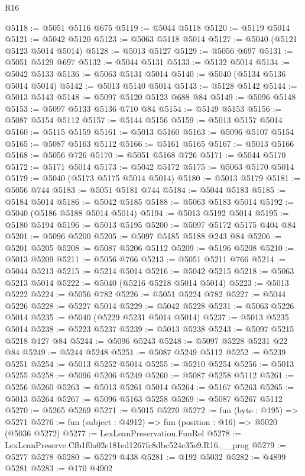 \begin{lexlean}{R16}
\begin{coremodule}
@5118 := @5051 @5116 @675
@5119 := @5044 @5118
@5120 := @5119 @5014
@5121 := @5042 @5120
@5123 := @5063 @5118 @5014
@5127 := @5040 (@5121 @5123 @5014 @5014)
@5128 := @5013 @5127
@5129 := @5056 @697
@5131 := @5051 @5129 @697
@5132 := @5044 @5131
@5133 := @5132 @5014
@5134 := @5042 @5133
@5136 := @5063 @5131 @5014
@5140 := @5040 (@5134 @5136 @5014 @5014)
@5142 := @5013 @5140 @5014
@5143 := @5128 @5142
@5144 := @5013 @5143
@5148 := @5097 @5120 @5123 @688 @84
@5149 := @5096 @5148
@5153 := @5097 @5133 @5136 @710 @84
@5154 := @5149 @5153
@5156 := @5087 @5154 @5112
@5157 := @5144 @5156
@5159 := @5013 @5157 @5014
@5160 := @5115 @5159
@5161 := @5013 @5160
@5163 := @5096 @5107 @5154
@5165 := @5087 @5163 @5112
@5166 := @5161 @5165
@5167 := @5013 @5166
@5168 := @5056 @726
@5170 := @5051 @5168 @726
@5171 := @5044 @5170
@5172 := @5171 @5014
@5173 := @5042 @5172
@5175 := @5063 @5170 @5014
@5179 := @5040 (@5173 @5175 @5014 @5014)
@5180 := @5013 @5179
@5181 := @5056 @744
@5183 := @5051 @5181 @744
@5184 := @5044 @5183
@5185 := @5184 @5014
@5186 := @5042 @5185
@5188 := @5063 @5183 @5014
@5192 := @5040 (@5186 @5188 @5014 @5014)
@5194 := @5013 @5192 @5014
@5195 := @5180 @5194
@5196 := @5013 @5195
@5200 := @5097 @5172 @5175 @404 @84
@5201 := @5096 @5200
@5205 := @5097 @5185 @5188 @243 @84
@5206 := @5201 @5205
@5208 := @5087 @5206 @5112
@5209 := @5196 @5208
@5210 := @5013 @5209
@5211 := @5056 @766
@5213 := @5051 @5211 @766
@5214 := @5044 @5213
@5215 := @5214 @5014
@5216 := @5042 @5215
@5218 := @5063 @5213 @5014
@5222 := @5040 (@5216 @5218 @5014 @5014)
@5223 := @5013 @5222
@5224 := @5056 @782
@5226 := @5051 @5224 @782
@5227 := @5044 @5226
@5228 := @5227 @5014
@5229 := @5042 @5228
@5231 := @5063 @5226 @5014
@5235 := @5040 (@5229 @5231 @5014 @5014)
@5237 := @5013 @5235 @5014
@5238 := @5223 @5237
@5239 := @5013 @5238
@5243 := @5097 @5215 @5218 @127 @84
@5244 := @5096 @5243
@5248 := @5097 @5228 @5231 @22 @84
@5249 := @5244 @5248
@5251 := @5087 @5249 @5112
@5252 := @5239 @5251
@5254 := @5013 @5252 @5014
@5255 := @5210 @5254
@5256 := @5013 @5255
@5258 := @5096 @5206 @5249
@5260 := @5087 @5258 @5112
@5261 := @5256 @5260
@5263 := @5013 @5261 @5014
@5264 := @5167 @5263
@5265 := @5013 @5264
@5267 := @5096 @5163 @5258
@5269 := @5087 @5267 @5112
@5270 := @5265 @5269
@5271 := @5015 @5270
@5272 := fun (byte : @195) => @5271
@5276 := fun (subject : @4912) => fun (position : @16) => @5020 (@5036 @5272)
@5277 := LexLeanPreservation.FunRel
@5278 := LexLeanPreserve.Cfb1f0a02e181ed1267fc8dbc524c35e9.R16.__prog
@5279 := @5277 @5278
@5280 := @5279 @438
@5281 := @192 @5032
@5282 := @4899 @5281
@5283 := @170 @4902

\end{coremodule}
\end{lexlean}
